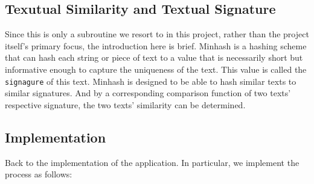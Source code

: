 \documentclass{article}
\begin{document}
\subsection{Texutual Similarity and Textual Signature}
Since this is only a subroutine we resort to in this project, rather than the project itself's primary focus, the introduction here is brief. Minhash is a hashing scheme that can hash each string or piece of text to a value that is necessarily short but informative enough to capture the uniqueness of the text. This value is called the \texttt{signagure} of this text. Minhash is designed to be able to hash similar texts to similar signatures. And by a corresponding comparison function of two texts' respective signature, the two texts' similarity can be determined.

\subsection{Implementation}
Back to the implementation of the application. In particular, we implement the process as follows:
\end{document}
